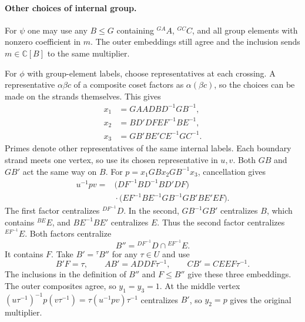 \documentclass[11pt,a4paper]{article}
\numberwithin{equation}{section}
\theoremstyle{definition}
\newcommand{\C}{\mathbb C}
\newcommand{\cg}[2]{{}^{#1}\!#2}
\begin{document}
\paragraph{Other choices of internal group.}
For \(\psi\) one may use any \(B\le G\) containing
\(\cg{\boxed{GA}}{A}\), \(\cg{\boxed{GC}}{C}\), and all group elements
with nonzero coefficient in \(m\). The outer embeddings still agree
and the inclusion sends \(m\in \C[B]\) to the same multiplier.

For \(\phi\) with group-element labels, choose representatives at
each crossing. A representative \(\alpha\beta c\) of a composite
coset factors as \(\alpha(\beta c)\), so the choices can be made on
the strands themselves. This gives
\begin{align*}
 x_1&=\boxed{GA}\boxed{AD}\boxed{BD}^{-1}\boxed{GB}^{-1},\\
 x_2&=\boxed{BD}'\boxed{DF}\boxed{EF}^{-1}\boxed{BE}^{-1},\\
 x_3&=\boxed{GB}'\boxed{BE}'\boxed{CE}^{-1}\boxed{GC}^{-1}.
\end{align*}
Primes denote other representatives of the same internal labels.
Each boundary strand meets one vertex, so use its chosen
representative in \(u,v\). Both \(\boxed{GB}\) and \(\boxed{GB}'\)
act the same way on \(B\). For
\(p=x_1\boxed{GB}x_2\boxed{GB}^{-1}x_3\), cancellation gives
\[
 \begin{aligned}
 u^{-1}pv={}&
 \bigl(\boxed{DF}^{-1}\boxed{BD}^{-1}\boxed{BD}'\boxed{DF}\bigr)\\
 &{}\cdot
 \bigl(\boxed{EF}^{-1}\boxed{BE}^{-1}\boxed{GB}^{-1}
       \boxed{GB}'\boxed{BE}'\boxed{EF}\bigr).
 \end{aligned}
\]
The first factor centralizes \(\cg{\boxed{DF}^{-1}}{D}\).
In the second, \(\boxed{GB}^{-1}\boxed{GB}'\) centralizes
\(B\), which contains \(\cg{\boxed{BE}}{E}\), and
\(\boxed{BE}^{-1}\boxed{BE}'\) centralizes \(E\). Thus the
second factor centralizes \(\cg{\boxed{EF}^{-1}}{E}\).
Both factors centralize
\[
 B''=\cg{\boxed{DF}^{-1}}{D}\cap\cg{\boxed{EF}^{-1}}{E}.
\]
It contains \(F\). Take \(B'=\cg{\tau}{B''}\) for any \(\tau\in U\)
and use
\[
 \boxed{B'F}=\tau,\qquad
 \boxed{AB'}=\boxed{AD}\boxed{DF}\tau^{-1},\qquad
 \boxed{CB'}=\boxed{CE}\boxed{EF}\tau^{-1}.
\]
The inclusions in the definition of \(B''\) and \(F\le B''\)
give these three embeddings. The outer composites agree, so
\(y_1=y_3=1\). At the middle vertex
\((u\tau^{-1})^{-1}p(v\tau^{-1})=\tau(u^{-1}pv)\tau^{-1}\)
centralizes \(B'\), so \(y_2=p\) gives the original multiplier.
\end{document}
